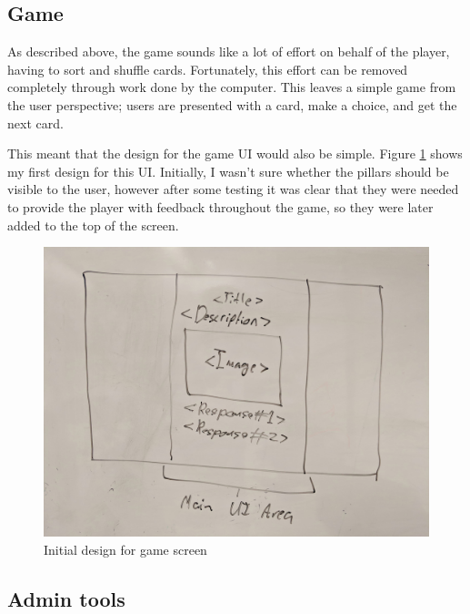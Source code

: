 \subsection{Game}
As described above, the game sounds like a lot of effort on behalf of the player, having to sort and shuffle cards. Fortunately, this effort can be removed completely through work done by the computer. This leaves a simple game from the user perspective; users are presented with a card, make a choice, and get the next card.

This meant that the design for the game UI would also be simple. Figure \ref{fig:game_drawing} shows my first design for this UI. Initially, I wasn't sure whether the pillars should be visible to the user, however after some testing it was clear that they were needed to provide the player with feedback throughout the game, so they were later added to the top of the screen.

\begin{figure}[!h]
	\centering
	\includegraphics[width=1.0\textwidth]{./images/design/game_drawing.jpg}
	\caption{Initial design for game screen}
	\label{fig:game_drawing}
\end{figure}

\subsection{Admin tools}

